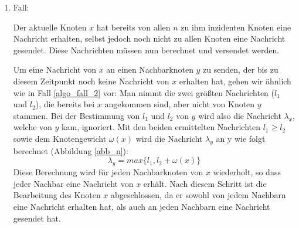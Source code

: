 \begin{enumerate}
		
	\item Fall:
	
		Der aktuelle Knoten $x$ hat bereits von allen $n$ zu ihm inzidenten Knoten eine Nachricht erhalten, selbst jedoch noch nicht zu allen Knoten eine Nachricht gesendet. Diese Nachrichten müssen nun berechnet und versendet werden.\label{labelAufUnterfall}
		
		
			
			
		
		Um eine Nachricht von $x$ an einen Nachbarknoten $y$ zu senden, der bis zu diesem Zeitpunkt noch keine Nachricht von $x$ erhalten hat, gehen wir ähnlich wie in Fall \ref{algo_fall_2} vor: Man nimmt die zwei größten Nachrichten ($l_{1}$ und $l_{2}$), die bereits bei $x$ angekommen sind, aber nicht von Knoten $y$ stammen. Bei der Bestimmung von $l_{1}$ und $l_{2}$ von $y$ wird also die Nachricht $\lambda_{x}$, welche von $y$ kam, ignoriert. Mit den beiden ermittelten Nachrichten $l_{1} \ge l_{2}$ sowie dem Knotengewicht $\omega(x)$ wird die Nachricht $\lambda_{y}$ an y wie folgt berechnet (Abbildung \ref{abb_n}):  $$\lambda_{y} = max\{l_{1},  l_{2} + \omega(x)\}$$
		Diese Berechnung wird für jeden Nachbarknoten von $x$ wiederholt, so dass jeder Nachbar eine Nachricht von $x$ erhält. Nach diesem Schritt ist die Bearbeitung des Knoten $x$ abgeschlossen, da er sowohl von jedem Nachbarn eine Nachricht erhalten hat, als auch an jeden Nachbarn eine Nachricht gesendet hat.
		
		
		
	
		
		
\end{enumerate}

